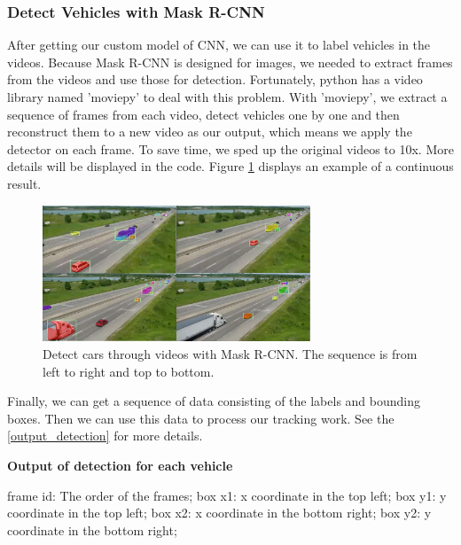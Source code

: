 \documentclass[10pt,twocolumn,letterpaper]{article}
\begin{document}
\subsubsection{Detect Vehicles with Mask R-CNN}

After getting our custom model of CNN, we can use it to label vehicles in the videos. Because Mask R-CNN is designed for images, we needed to extract frames from the videos and use those for detection. Fortunately, python has a video library named 'moviepy' to deal with this problem. With 'moviepy', we extract a sequence of frames from each video, detect vehicles one by one and then reconstruct them to a new video as our output, which means we apply the detector on each frame. To save time, we sped up the original videos to 10x. More details will be displayed in the code. Figure \ref{seq_cars} displays an example of a continuous result. 
	
	\begin{figure}  
    \includegraphics[width=8cm]{images/car.png}
    \caption{Detect cars through videos with Mask R-CNN. The sequence is from left to right and top to bottom.}
    \label{seq_cars}
	\end{figure}

	
Finally, we can get a sequence of data consisting of the labels and bounding boxes. Then we can use this data to process our tracking work. See the \ref{output_detection} for more details.

\begin{algorithm}[!tbp]
\label{output_detection}
\begin{algorithmic}[0]
\State \textbf{Output of detection for each vehicle} 
\end{algorithmic}

\begin{algorithmic}[1]
\State frame id: The order of the frames;
\State box x1: x coordinate in the top left;
\State box y1: y coordinate in the top left;
\State box x2: x coordinate in the bottom right;
\State box y2: y coordinate in the bottom right;
\end{algorithmic}
\end{algorithm}
	
\end{document}
